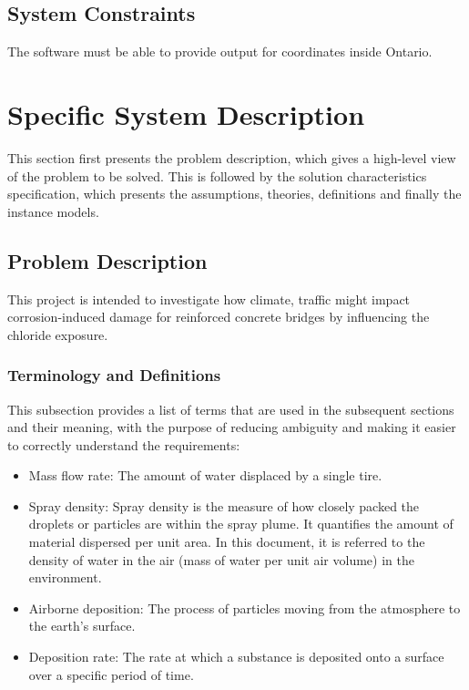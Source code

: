 \documentclass[12pt]{article}
\begin{document}
\subsection{System Constraints}
 The software must be able to provide output for coordinates inside Ontario. 
  
\section{Specific System Description}

This section first presents the problem description, which gives a high-level
view of the problem to be solved.  This is followed by the solution characteristics
specification, which presents the assumptions, theories, definitions and finally
the instance models.  

\subsection{Problem Description} \label{Sec_pd}
This project is intended to investigate how climate, traffic might impact corrosion-induced damage for reinforced concrete bridges by influencing the chloride exposure.

\subsubsection{Terminology and  Definitions}
This subsection provides a list of terms that are used in the subsequent
sections and their meaning, with the purpose of reducing ambiguity and making it
easier to correctly understand the requirements:

\begin{itemize}
\item Mass flow rate: The amount of water displaced by a single tire.
\item Spray density: Spray density is the measure of how closely packed the droplets or particles are within the spray plume. It quantifies the amount of material dispersed per unit area. In this document, it is referred to the density of water in the air (mass of water per unit air volume) in the environment.
\item Airborne deposition: The process of particles moving from the atmosphere to the earth's surface.
\item Deposition rate: The rate at which a substance is deposited onto a surface over a specific period of time.

\end{itemize}
\end{document}
